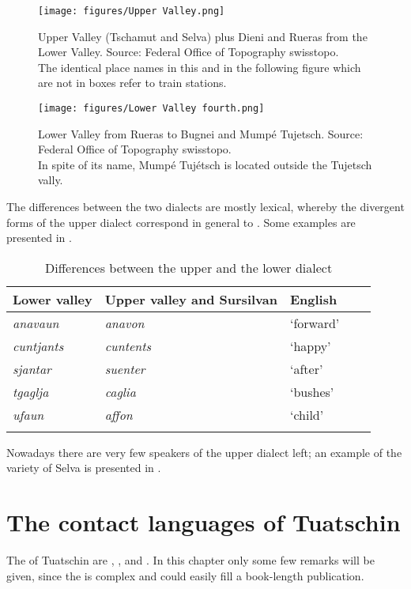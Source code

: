 \begin{figure}
	\texttt{[image: figures/Upper Valley.png]}
	\caption{Upper Valley (Tschamut and Selva) plus Dieni and Rueras from the Lower Valley. Source: Federal Office of Topography swisstopo.\\
	{The identical place names in this and in the following figure which are not in boxes refer to train stations.}
	}
	\label{fig:uppervalley}
\end{figure}

\begin{figure}
	\texttt{[image: figures/Lower Valley fourth.png]}
	\caption{Lower Valley from Rueras to Bugnei and Mumpé Tujetsch. Source: Federal Office of Topography swisstopo.\\
	{In spite of its name, Mumpé Tujétsch is located outside the Tujetsch vally.}
	}
	\label{fig:lowervalley}
\end{figure}

The differences between the two dialects are mostly lexical, whereby the divergent forms of the upper dialect correspond in general to . Some examples are presented in  \citep[97]{VicHendry2010}.

\begin{table}
	\caption{Differences between the upper and the lower dialect}
	\label{difdial}
	\begin{tabular}{lllll}
		\lsptoprule
		Lower valley &  Upper valley and Sursilvan & English\\
		\midrule
		\textit{anavaun} & \textit{anavon} & `forward' \\
		\textit{cuntjants} & \textit{cuntents} & `happy' \\
		\textit{sjantar} & \textit{suenter} & `after'\\
		\textit{tgaglja} & \textit{caglia} & `bushes'\\
		\textit{ufaun} & \textit{affon} & `child' \\
		\lspbottomrule
	\end{tabular}
\end{table}

Nowadays there are very few speakers of the upper dialect left; an example of the variety of Selva is presented in .

\section{The contact languages of Tuatschin}\label{sec:1.4}
The  of Tuatschin are , , and . In this chapter only some few remarks will be given, since the  is complex and could easily fill a book-length publication. 

